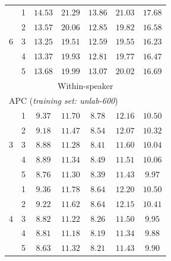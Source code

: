 \documentclass[transmag]{IEEEtran}
\begin{document}
\begin{table}[!t]
{\begin{tabular}{c|c|cccc|c}
\midrule
\multirow{5}{*}{6} 
  & 1& $14.53$&$21.29$&$13.86$&$21.03$&$17.68$\\
  & 2&  $13.57$&$20.06$&$12.85$&$19.82$&$16.58$\\
  & 3& $\bm{13.25}$&$\bm{19.51}$&$\bm{12.59}$&$\bm{19.55}$&$\bm{16.23}$\\
  & 4&$13.37$&$19.93$&$12.81$&$19.77$&$16.47$\\
  & 5&  $13.68$&$19.99$&$13.07$&$20.02$&$16.69$ \\


\midrule
\midrule
\multicolumn{7}{c}{Within-speaker} \\

\multicolumn{7}{l}{APC (\textit{training set: unlab-600})}\\

\multirow{5}{*}{3}
  & 1& $9.37$&$11.70$&$8.78$&$12.16$&$10.50$ \\
  & 2& $9.18$&$11.47$&$8.54$&$12.07$&$10.32$
\\
  & 3& $8.88$&$\bm{11.28}$&$8.41$&$11.60$&$10.04$
\\
  & 4& $8.89$&$11.34$&$8.49$&$11.51$&$10.06$
\\
  & 5& $\bm{8.76}$&$11.30$&$\bm{8.39}$&$\bm{11.43}$&$\bm{9.97}$\\
 \midrule
\multirow{5}{*}{4} 
  & 1 &$9.36$&$11.78$&$8.64$&$12.20$&$10.50$\\
  & 2& $9.22$&$11.62$&$8.64$&$12.15$&$10.41$
\\
  & 3& $8.82$&$11.22$&$8.26$&$11.50$&$9.95$
\\
  & 4& $8.81$&$\bm{11.18}$&$\bm{8.19}$&$\bm{11.34}$&$\bm{9.88}$
\\
  & 5& $\bm{8.63}$&$11.32$&$8.21$&$11.43$&$9.90$ \\


\end{tabular}}
\end{table}
\end{document}
